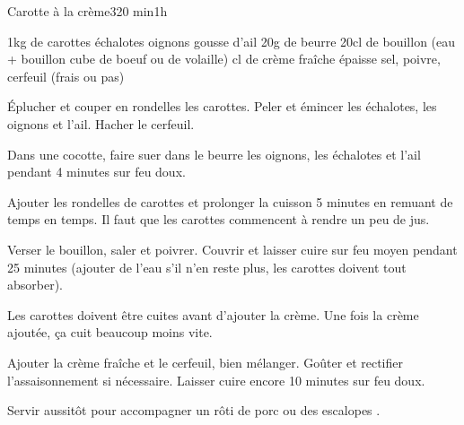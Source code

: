 \begin{recette}{Carotte à la crème}{3}{20 min}{1h}
\begin{ingredients}
\ingredient 1kg de carottes
 échalotes
 oignons
 gousse d'ail
\ingredient 20g de beurre
\ingredient 20cl de bouillon (eau + bouillon cube de boeuf ou de volaille)
 cl de crème fraîche épaisse
\ingredient sel, poivre, cerfeuil (frais ou pas)
\end{ingredients}

\begin{preparation}
\etape Éplucher et couper en rondelles les carottes. Peler et émincer les échalotes, les oignons et l’ail. Hacher le cerfeuil.

\etape Dans une cocotte, faire suer dans le beurre les oignons, les échalotes et l’ail pendant 4 minutes sur feu doux.

\etape Ajouter les rondelles de carottes et prolonger la cuisson 5 minutes en remuant de temps en temps. Il faut que les carottes commencent à rendre un peu de jus.

\etape Verser le bouillon, saler et poivrer. Couvrir et laisser cuire sur feu moyen pendant 25 minutes (ajouter de l'eau s'il n'en reste plus, les carottes doivent tout absorber).

\begin{remarque}
Les carottes doivent être cuites avant d'ajouter la crème. Une fois la crème ajoutée, ça cuit beaucoup moins vite.
\end{remarque}

\etape Ajouter la crème fraîche et le cerfeuil, bien mélanger. Goûter et rectifier l’assaisonnement si nécessaire. Laisser cuire encore 10 minutes sur feu doux.

\etape Servir aussitôt pour accompagner un rôti de porc ou des escalopes .
\end{preparation}

\end{recette}

